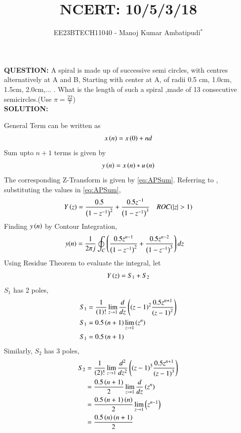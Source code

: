 \documentclass[journal,12pt,twocolumn]{IEEEtran}
\theoremstyle{remark}
\begin{document}

\vspace{3cm}
\title{NCERT: 10/5/3/18}
\author{EE23BTECH11040 - Manoj Kumar Ambatipudi$^{*}$%
}
\maketitle
\newpage
\bigskip
\renewcommand{\thefigure}{\theenumi}
\renewcommand{\thetable}{\theenumi}
\textbf{QUESTION:}
A spiral is made up of successive semi circles, with centres alternatively at A and B, Starting with center at A, of radii 0.5 cm, 1.0cm, 1.5cm, 2.0cm,... . What is the length of such a spiral ,made of 13 consecutive semicircles.(Use $\pi = \frac{22}{7}$) \\
\textbf{SOLUTION:}


General Term can be written as 
\begin{align}
    x\left(n\right) = x\left(0\right) + nd
\end{align}
Sum upto $n + 1$ terms is given by
\begin{align}
    y\left(n\right) = x\left(n\right)*u\left(n\right)
\end{align}
The corresponding Z-Transform is given by \eqref{eq:APSum}.
Referring to , substituting the values in \eqref{eq:APSum}, 
\begin{align}
    Y\left(z\right) = \frac{0.5}{\left(1 - z^{-1}\right)^2} + \frac{0.5z^{-1}}{\left(1-z^{-1}\right)^3} \quad ROC(\left\vert z\right\vert > 1)
\end{align}
Finding $y\left(n\right)$ by Contour Integration, 
\begin{align}
     y(n)&=\frac{1}{2\pi j}\oint_{C}\left(\dfrac{0.5z^{n-1}}{\left(1-z^{-1}\right)^2} + \dfrac{0.5z^{n-2}}{\left(1-z^{-1}\right)^{3}}\right)dz  
\end{align}
Using Residue Theorem to evaluate the integral, let 
\begin{align}
    Y\left(z\right) = S_{1} + S_{2}
\end{align}
$S_{1}$ has 2 poles,
\begin{align}
    S_{1} &= \frac{1}{\left(1\right)!}\lim\limits_{z\to 1}\frac{d}{dz}\left({(z-1)}^{2}\frac{0.5z^{n+1}}{{(z-1)}^2}\right)\\
    S_{1} &= 0.5\left(n+1\right)\lim\limits_{z\to 1}\left(z^n\right)\\
    S_{1} &=0.5\left(n+1\right)
\end{align}
Similarly, $S_{2}$ has 3 poles, 
\begin{align}
    S_{2}&=\frac{1}{\left(2\right)!}\lim\limits_{z\to 1}\frac{d^{2}}{dz^{2}}\left({(z-1)}^{3}\frac{0.5z^{n+1}}{{(z-1)}^3}\right)\\
    &=\frac{0.5\left(n+1\right)}{2}\lim\limits_{z\to 1}\frac{d}{dz}\left(z^n\right)\\
    &=\frac{0.5\left(n+1\right)\left(n\right)}{2}\lim\limits_{z\to 1}\left(z^{n-1}\right)\\
    &=\frac{0.5\left(n\right)\left(n+1\right)}{2}
\end{align}
\end{document}
